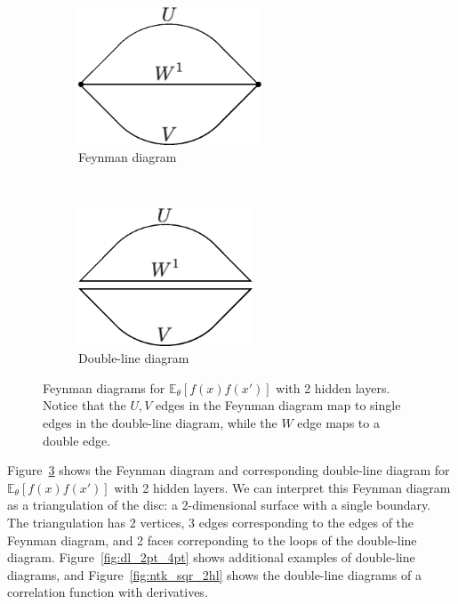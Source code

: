 \documentclass[english]{article}
\newcommand{\lexpp}[1]{\mathbb{E}_{#1}\left[}
\newcommand{\rexp}{\right]}
\begin{document}
\begin{figure}
    \centering
    \begin{subfigure}[b]{0.3\textwidth}
      \centering
      \includegraphics[width=0.6\textwidth]{new_figs/f_2_2hl_sl}
      \caption{Feynman diagram}
      \label{fig:f2_2_sl}
    \end{subfigure}\ \ \ \ \ \ \ \ 
    \begin{subfigure}[b]{0.3\textwidth}
      \centering
      \includegraphics[width=0.57\textwidth]{new_figs/f_2_2hl_dl}
      \caption{Double-line diagram}
      \label{fig:f2_2_dl}
    \end{subfigure}
    \caption{Feynman diagrams for $\lexpp{\theta} f(x) f(x') \rexp$ with 2 hidden layers.
      Notice that the $U,V$ edges in the Feynman diagram map to single edges in the double-line diagram, while the $W$ edge maps to a double edge.}
    \label{fig:f2_2hl_sldl}
\end{figure}
Figure~\ref{fig:f2_2hl_sldl} shows the Feynman diagram and corresponding double-line diagram for $\lexpp{\theta} f(x) f(x') \rexp$ with 2 hidden layers.
We can interpret this Feynman diagram as a triangulation of the disc: a 2-dimensional surface with a single boundary.
The triangulation has 2 vertices, 3 edges corresponding to the edges of the Feynman diagram, and 2 faces correponding to the loops of the double-line diagram.
Figure~\ref{fig:dl_2pt_4pt} shows additional examples of double-line diagrams, and Figure~\ref{fig:ntk_sqr_2hl} shows the double-line diagrams of a correlation function with derivatives.
\end{document}
